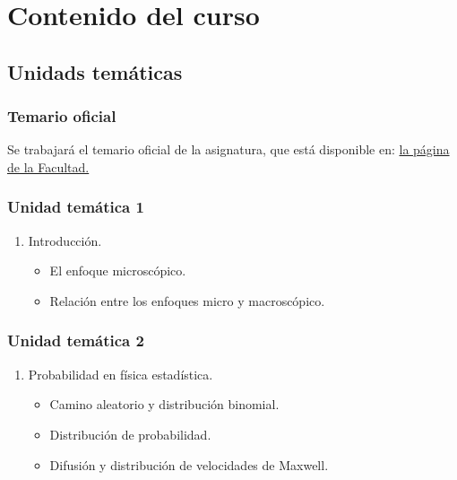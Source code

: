\documentclass[12pt]{beamer}
\begin{document}
\section{Contenido del curso}
\subsection{Unidads temáticas}

\begin{frame}
\frametitle{Temario oficial}
Se trabajará el temario oficial de la asignatura, que está disponible en: \href{https://www.fciencias.unam.mx/sites/default/files/temario/829.pdf}{la página de la Facultad.}
\end{frame}
\begin{frame}
\frametitle{Unidad temática 1}
\begin{enumerate}[<+->]
\item Introducción.
\pause
\begin{itemize}[<+->]
    \item[\ding{51}] El enfoque microscópico.
    \item[\ding{51}] Relación entre los enfoques micro y macroscópico.
\end{itemize}
\seti
\end{enumerate}
\end{frame}
\begin{frame}
\frametitle{Unidad temática 2}
\begin{enumerate}[<+->]
\conti
\item Probabilidad en física estadística.
\pause
\begin{itemize}[<+->]
    \item[\ding{51}] Camino aleatorio y distribución binomial.
    \item[\ding{51}] Distribución de probabilidad.
    \item[\ding{51}] Difusión y distribución de velocidades de Maxwell. 
\end{itemize}
\seti
\end{enumerate}
\end{frame}
\end{document}
